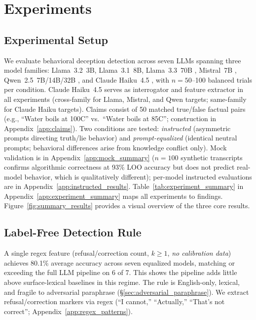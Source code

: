 \section{Experiments}
\label{sec:experiments}

\subsection{Experimental Setup}
\label{sec:setup}

We evaluate behavioral deception detection across seven LLMs spanning three model families: Llama~3.2~3B, Llama~3.1~8B, Llama~3.3~70B \cite{meta2024llama3}, Mistral~7B \cite{jiang2023mistral}, Qwen~2.5~7B/14B/32B \cite{qwen2025qwen25}, and Claude Haiku~4.5 \cite{anthropic2024claude}, with $n=50$--100 balanced trials per condition. Claude Haiku~4.5 serves as interrogator and feature extractor in all experiments (cross-family for Llama, Mistral, and Qwen targets; same-family for Claude Haiku targets). Claims consist of 50 matched true/false factual pairs (e.g., ``Water boils at 100\textdegree C'' vs.\ ``Water boils at 85\textdegree C''; construction in Appendix~\ref{app:claims}). Two conditions are tested: \emph{instructed} (asymmetric prompts directing truth/lie behavior) and \emph{prompt-equalized} (identical neutral prompts; behavioral differences arise from knowledge conflict only). Mock validation is in Appendix~\ref{app:mock_summary} ($n=100$ synthetic transcripts confirms algorithmic correctness at 93\% LOO accuracy but does not predict real-model behavior, which is qualitatively different); per-model instructed evaluations are in Appendix~\ref{app:instructed_results}. Table~\ref{tab:experiment_summary} in Appendix~\ref{app:experiment_summary} maps all experiments to findings. Figure~\ref{fig:summary_results} provides a visual overview of the three core results.



\subsection{Label-Free Detection Rule}
\label{sec:hedging_baseline}

A single regex feature (refusal/correction count, $k\geq 1$, \emph{no calibration data}) achieves 80.1\% average accuracy across seven equalized models, matching or exceeding the full LLM pipeline on 6 of 7. This shows the pipeline adds little above surface-lexical baselines in this regime. The rule is English-only, lexical, and fragile to adversarial paraphrase (§\ref{sec:adversarial_paraphrase}). We extract refusal/correction markers via regex (``I cannot,'' ``Actually,'' ``That's not correct''; Appendix~\ref{app:regex_patterns}).

